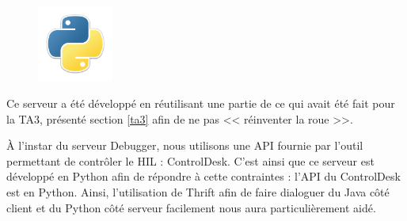 \begin{figure}
	\includegraphics[width=2.5cm]{contents/images/python.png}
\end{figure}
Ce serveur a été développé en réutilisant une partie de ce qui avait été fait pour la TA3, présenté section \ref{ta3} afin de ne pas
<< réinventer la roue >>. 

À l'instar du serveur Debugger, nous utilisons une API fournie par l'outil permettant de contrôler le HIL : ControlDesk. 
C'est ainsi que ce serveur est développé en Python afin de répondre à cette contraintes : l'API du ControlDesk est en Python. Ainsi, l'utilisation de Thrift afin de faire dialoguer du Java côté client et du Python côté serveur facilement nous aura particulièrement aidé.


